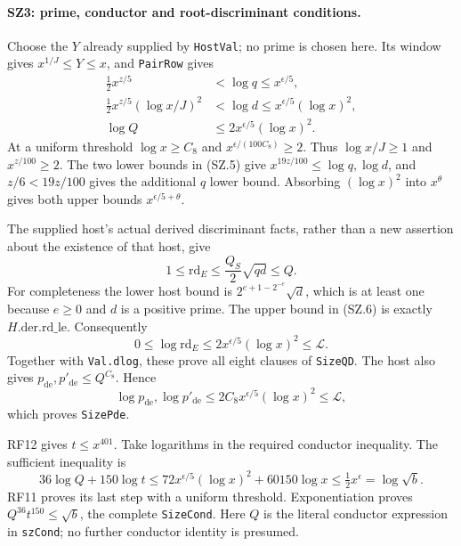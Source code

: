 \paragraph{SZ3: prime, conductor and root-discriminant conditions.}
Choose the $Y$ already supplied by \texttt{HostVal}; no prime is
chosen here. Its window gives $x^{1/J}\leq Y\leq x$, and
\texttt{PairRow} gives
\[
 \begin{split}
 \tfrac12 x^{z/5}&<\log q\leq x^{\epsilon/5},\\
 \tfrac12 x^{z/5}(\log x/J)^2
             &<\log d\leq x^{\epsilon/5}(\log x)^2,\\
 \log Q&\leq2x^{\epsilon/5}(\log x)^2.
 \end{split}                                                    \tag{SZ.5}
\]
At a uniform threshold $\log x\geq C_8$ and
$x^{\epsilon/(100C_8)}\geq2$. Thus $\log x/J\geq1$ and
$x^{z/100}\geq2$. The two lower bounds in (SZ.5) give
$x^{19z/100}\leq\log q,\log d$, and
$z/6<19z/100$ gives the additional $q$ lower bound.
Absorbing $(\log x)^2$ into $x^\theta$ gives both upper bounds
$x^{\epsilon/5+\theta}$.

The supplied host's actual derived discriminant facts, rather than a
new assertion about the existence of that host, give
\[
 1\leq\mathrm{rd}_E\leq\frac{Q_S}{2}\sqrt{qd}\leq Q.
                                                                    \tag{SZ.6}
\]
For completeness the lower host bound is
$2^{e+1-2^{-e}}\sqrt d$, which is at least one because $e\geq0$
and $d$ is a positive prime. The upper bound in (SZ.6) is exactly
$H.\mathrm{der.rd\_le}$. Consequently
\[
 0\leq\log\mathrm{rd}_E\leq2x^{\epsilon/5}(\log x)^2
                                     \leq\mathcal L.           \tag{SZ.7}
\]
Together with \texttt{Val.dlog}, these prove all eight clauses of
\texttt{SizeQD}. The host also gives
$p_{\mathrm{de}},p'_{\mathrm{de}}\leq Q^{C_8}$. Hence
\[
 \log p_{\mathrm{de}},\log p'_{\mathrm{de}}
      \leq2C_8x^{\epsilon/5}(\log x)^2\leq\mathcal L,
\]
which proves \texttt{SizePde}.

RF12 gives $t\leq x^{401}$. Take logarithms in the required
conductor inequality. The sufficient inequality is
\[
 36\log Q+150\log t
    \leq72x^{\epsilon/5}(\log x)^2+60150\log x
    \leq\tfrac12 x^\epsilon=\log\sqrt b.                       \tag{SZ.8}
\]
RF11 proves its last step with a uniform threshold. Exponentiation
proves $Q^{36}t^{150}\leq\sqrt b$, the complete
\texttt{SizeCond}. Here $Q$ is the literal conductor expression
in \texttt{szCond}; no further conductor identity is presumed.

